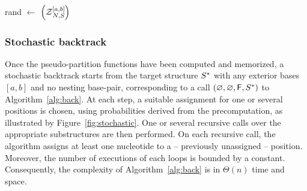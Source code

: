 \begin{algorithm}[t]
\DontPrintSemicolon
	\SetAlgoLined
{}
	rand $\leftarrow$ \Random$\left(\Z{\N,\Struct}{a,b}\right)$\tcp*[r]{Draw random number in $[0,\Z{\N,\Struct}{a,b}[$}
\caption{\protect\Backtrack$\left(a,b,\N,\Struct\right)$\label{alg:back}}
\end{algorithm}
\subsubsection{Stochastic backtrack}
Once the pseudo-partition functions have been computed and memorized, a stochastic backtrack starts from the target structure $\Target$ with any exterior bases $[a,b]$ and no nesting base-pair, corresponding to a call \Backtrack$\left(\varnothing,\varnothing,\BoolFalse,\Target\right)$ to Algorithm~\ref{alg:back}.  At each step, a suitable assignment for one or several positions is chosen, using probabilities derived from the precomputation, as illustrated by Figure~\ref{fig:stochastic}. One or several recursive calls over the appropriate substructures are then performed. On each recursive call, the algorithm assigns at least one nucleotide to a -- previously unassigned -- position. Moreover, the number of executions of each loops is bounded by a constant. Consequently, the complexity of Algorithm~\ref{alg:back} is in $\Theta(n)$ time and space. 




